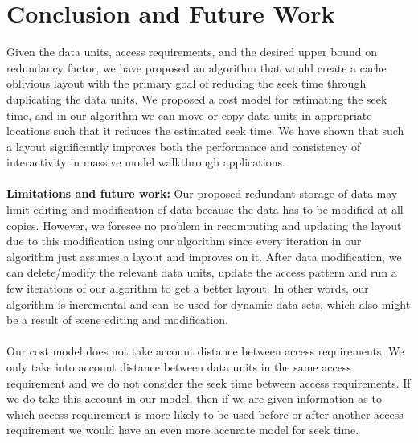 
\section{Conclusion and Future Work}

Given the data units, access requirements, and the desired upper bound on
redundancy factor, we have proposed an algorithm that would create a cache
oblivious layout with the primary goal of reducing the seek time through
duplicating the data units. We proposed a cost model for estimating the seek
time, and in our algorithm we can move or copy data units in appropriate
locations such that it reduces the estimated seek time.  We have shown that
such a layout significantly improves both the performance and consistency of
interactivity in massive model walkthrough applications.  \\ 
\\
{\bf Limitations and future work:}
Our proposed redundant storage of data may limit editing and modification of data because the data has to be modified at all copies. However, we foresee no problem in recomputing and updating the layout due to this modification using our algorithm since every iteration in our algorithm just assumes a layout and improves on it. After data modification, we can delete/modify the relevant data units, update the access pattern and run a few iterations of our algorithm to get a better layout. In other words, our algorithm is incremental and can be used for dynamic data sets, which also might be a result of scene editing and modification.\\
\\
Our cost model does not take account distance between access requirements. We only take into account distance between data units in the same access requirement and we do not consider the seek time between access requirements. If we do take this account in our model, then if we are given information as to which access requirement is more likely to be used before or after another access requirement we would have an even more accurate model for seek time.

